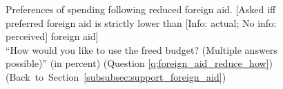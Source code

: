 \begin{figure}[h!]
    \caption[Preferences of spending following reduced foreign aid]{Preferences of spending following reduced foreign aid. [Asked iff preferred foreign aid is strictly lower than [Info: actual; No info: perceived] foreign aid] \\ ``How would you like to use the freed budget? (Multiple answers possible)'' (in percent) (Question \ref{q:foreign_aid_reduce_how})  \hfill (Back~to~Section~\ref{subsubsec:support_foreign_aid})}\label{fig:foreign_aid_reduce_how}
\end{figure}



